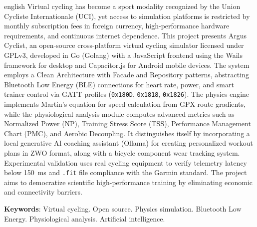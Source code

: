 \documentclass[
    a4paper,
    12pt,
    oneside,
    english,
    brazil,
    chapter=TITLE,
    section=TITLE,
]{abntex2}
\begin{document}
\begin{resumo}[Abstract]
\begin{otherlanguage*}{english}
Virtual cycling has become a sport modality recognized by the Union Cycliste Internationale (UCI), yet access to simulation platforms is restricted by monthly subscription fees in foreign currency, high-performance hardware requirements, and continuous internet dependence. This project presents Argus Cyclist, an open-source cross-platform virtual cycling simulator licensed under GPLv3, developed in Go (Golang) with a JavaScript frontend using the Wails framework for desktop and Capacitor.js for Android mobile devices. The system employs a Clean Architecture with Facade and Repository patterns, abstracting Bluetooth Low Energy (BLE) connections for heart rate, power, and smart trainer control via GATT profiles (\texttt{0x180D}, \texttt{0x1818}, \texttt{0x1826}). The physics engine implements Martin's equation for speed calculation from GPX route gradients, while the physiological analysis module computes advanced metrics such as Normalized Power (NP), Training Stress Score (TSS), Performance Management Chart (PMC), and Aerobic Decoupling. It distinguishes itself by incorporating a local generative AI coaching assistant (Ollama) for creating personalized workout plans in ZWO format, along with a bicycle component wear tracking system. Experimental validation uses real cycling equipment to verify telemetry latency below \SI{150}{\milli\second} and \texttt{.fit} file compliance with the Garmin standard. The project aims to democratize scientific high-performance training by eliminating economic and connectivity barriers.

\textbf{Keywords}: Virtual cycling. Open source. Physics simulation. Bluetooth Low Energy. Physiological analysis. Artificial intelligence.
\end{otherlanguage*}
\end{resumo}

\listoffigures*
\clearpage

\listoftables*
\clearpage

\tableofcontents*
\clearpage
\end{document}
